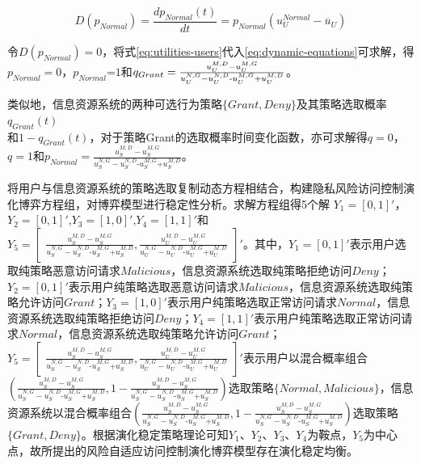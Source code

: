 \begin{equation}\label{eq:dynamic-equations}
D({{p}_{Normal}})=\frac{d{{p}_{Normal}}(t)}{dt}={{p}_{Normal}}(u_{U}^{Normal}-{{\overline{u}}_{U}})
\end{equation}

 令$D({{p}_{Normal}})=0$，将式\ref{eq:utilities-users}代入\ref{eq:dynamic-equations}可求解，得${{p}_{Normal}}=0$，${{p}_{Normal}}\text{=}1$和${{q}_{Grant}}=\\\frac{u_{U}^{M,D}-u_{U}^{M,G}}{u_{U}^{N,G}-u_{U}^{N,D}\text{-}u_{U}^{M,G}\text{+}u_{U}^{M,D}}$。
 
 类似地，信息资源系统的两种可选行为策略$\{Grant,Deny\}$及其策略选取概率$q_{Grant}(t)$~\\和$1-q_{Grant}(t)$，对于策略Grant的选取概率时间变化函数，亦可求解得$q=0$，$q=1$和${{p}_{Normal}}=\frac{u_{S}^{M,D}-u_{S}^{M,G}}{u_{S}^{N,G}-u_{S}^{N,D}\text{-}u_{S}^{M,G}\text{+}u_{S}^{M,D}}$。

将用户与信息资源系统的策略选取复制动态方程相结合，构建隐私风险访问控制演化博弈方程组，对博弈模型进行稳定性分析。求解方程组得5个解 ${{Y}_{1}}=[0,1]'$，${{Y}_{2}}=\left[ 0 ,1 \right]'$,${{Y}_{3}}=\left[1 ,0 \right]'$,${{Y}_{4}}=\left[ 1 ,1 \right]'$和${{Y}_{5}}=
\begin{bmatrix}
\frac{u_{S}^{M,D}-u_{S}^{M,G}}{u_{S}^{N,G}-u_{S}^{N,D}\text{-}u_{S}^{M,G}\text{+}u_{S}^{M,D}},
\frac{u_{U}^{M,D}-u_{U}^{M,G}}{u_{U}^{N,G}-u_{U}^{N,D}\text{-}u_{U}^{M,G}\text{+}u_{U}^{M,D}}
\end{bmatrix}'$。其中，${{Y}_{1}}=[0,1]'$表示用户选取纯策略恶意访问请求$Malicious$，信息资源系统选取纯策略拒绝访问$Deny$；${{Y}_{2}}=\left[ 0 ,1 \right]'$表示用户纯策略选取恶意访问请求$Malicious$，信息资源系统选取纯策略允许访问$Grant$；${{Y}_{3}}=\left[1 ,0 \right]'$表示用户纯策略选取正常访问请求$Normal$，信息资源系统选取纯策略拒绝访问$Deny$；${{Y}_{4}}=\left[ 1 ,1 \right]'$表示用户纯策略选取正常访问请求$Normal$，信息资源系统选取纯策略允许访问$Grant$；${{Y}_{5}}=
\begin{bmatrix}
\frac{u_{S}^{M,D}-u_{S}^{M,G}}{u_{S}^{N,G}-u_{S}^{N,D}\text{-}u_{S}^{M,G}\text{+}u_{S}^{M,D}},
\frac{u_{U}^{M,D}-u_{U}^{M,G}}{u_{U}^{N,G}-u_{U}^{N,D}\text{-}u_{U}^{M,G}\text{+}u_{U}^{M,D}}
\end{bmatrix}'$表示用户以混合概率组合$( \frac{u_{S}^{M,D}-u_{S}^{M,G}}{u_{S}^{N,G}-u_{S}^{N,D}\text{-}u_{S}^{M,G}\text{+}u_{S}^{M,D}}, 1- \frac{u_{S}^{M,D}-u_{S}^{M,G}}{u_{S}^{N,G}-u_{S}^{N,D}\text{-}u_{S}^{M,G}\text{+}u_{S}^{M,D}})$选取策略$\{Normal, Malicious\}$，信息资源系统以混合概率组合$(\frac{u_{S}^{M,D}-u_{S}^{M,G}}{u_{S}^{N,G}-u_{S}^{N,D}\text{-}u_{S}^{M,G}\text{+}u_{S}^{M,D}} , 1-\frac{u_{S}^{M,D}-u_{S}^{M,G}}{u_{S}^{N,G}-u_{S}^{N,D}\text{-}u_{S}^{M,G}\text{+}u_{S}^{M,D}} )$选取策略$\{Grant, Deny\}$。根据演化稳定策略理论可知$Y_1$、$Y_2$、$Y_3$、$Y_4$为鞍点，$Y_5$为中心点，故所提出的风险自适应访问控制演化博弈模型存在演化稳定均衡。


